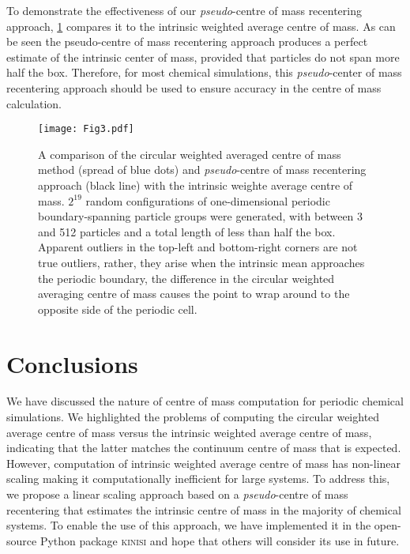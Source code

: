 \documentclass[reprint,superscriptaddress,nobibnotes,amsmath,amssymb,aip]{revtex4-2}
\begin{document}
To demonstrate the effectiveness of our \emph{pseudo}-centre of mass recentering approach, \cref{fig:method_valid} compares it to the intrinsic weighted average centre of mass. 
As can be seen the pseudo-centre of mass recentering approach produces a perfect estimate of the intrinsic center of mass, provided that particles do not span more half the box. 
Therefore, for most chemical simulations, this \emph{pseudo}-center of mass recentering approach should be used to ensure accuracy in the centre of mass calculation. 
%
\begin{figure}
    \centering
    \texttt{[image: Fig3.pdf]}
    \caption{A comparison of the circular weighted averaged centre of mass method (spread of blue dots) and \emph{pseudo}-centre of mass recentering approach (black line) with the intrinsic weighte average centre of mass. 
    $2^{19}$ random configurations of one-dimensional periodic boundary-spanning particle groups were generated, with between 3 and 512 particles and a total length of less than half the box. 
    Apparent outliers in the top-left and bottom-right corners are not true outliers, rather, they arise when the intrinsic mean approaches the periodic boundary, the difference in the circular weighted averaging centre of mass causes the point to wrap around to the opposite side of the periodic cell.
    }
    \label{fig:method_valid}
\end{figure}
%

\section{Conclusions}

We have discussed the nature of centre of mass computation for periodic chemical simulations.
We highlighted the problems of computing the circular weighted average centre of mass versus the intrinsic weighted average centre of mass, indicating that the latter matches the continuum centre of mass that is expected. 
However, computation of intrinsic weighted average centre of mass has non-linear scaling making it computationally inefficient for large systems. 
To address this, we propose a linear scaling approach based on a \emph{pseudo}-centre of mass recentering that estimates the intrinsic centre of mass in the majority of chemical systems. 
To enable the use of this approach, we have implemented it in the open-source Python package \textsc{kinisi}\cite{mccluskey_kinisi_2024} and hope that others will consider its use in future. 
\end{document}
